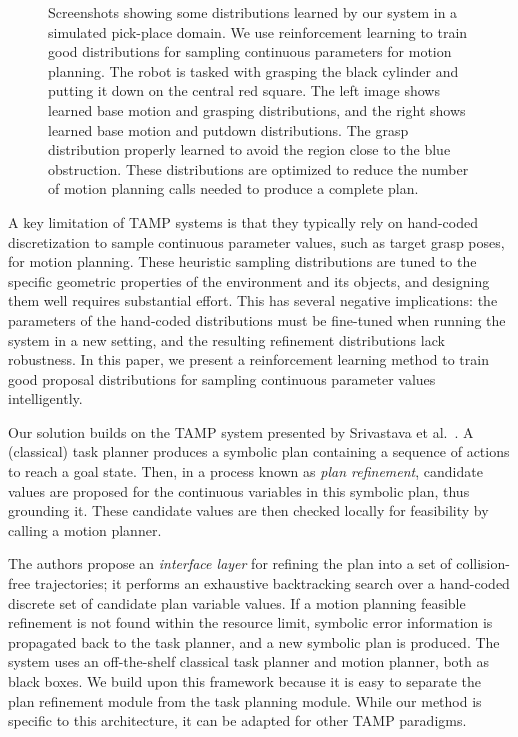 \begin{figure}[h]
  \caption{Screenshots showing some distributions learned by our system in a simulated pick-place
    domain. We use reinforcement learning to train good distributions for sampling continuous parameters
    for motion planning. The robot is tasked with grasping the black cylinder and putting it down on the
    central red square. The left image shows learned base motion and grasping distributions,
    and the right shows learned base motion and putdown distributions. The grasp distribution
    properly learned to avoid the region close to the blue obstruction. These distributions are
    optimized to reduce the number of motion planning calls needed to produce a complete plan.}
  \label{fig:cover}
\end{figure}

A key limitation of TAMP systems is that they typically rely on hand-coded discretization to
sample continuous parameter values, such as target grasp poses, for motion planning.
These heuristic sampling distributions are tuned to the specific
geometric properties of the environment and its objects, and designing them well
requires substantial effort. This has several negative implications: the parameters of the
hand-coded distributions must be fine-tuned when running the system in a new setting, and the
resulting refinement distributions lack robustness. In this paper, we present a reinforcement
learning method to train good proposal distributions for sampling continuous parameter
values intelligently.

Our solution builds on the TAMP system
presented by Srivastava et al.~\cite{srivastava2014combined}.
A (classical) task planner produces a symbolic plan containing
a sequence of actions to reach a goal state. Then, in a process known as \emph{plan refinement},
candidate values are proposed for the continuous variables in this symbolic plan, thus grounding it.
These candidate values are then checked locally for feasibility by calling a motion planner.

The authors propose an \emph{interface layer} for refining the plan into a set
of collision-free trajectories; it performs an exhaustive
backtracking search over a hand-coded discrete set of candidate plan variable values. If a motion
planning feasible refinement is not found within the resource limit,
symbolic error information is propagated back to the task planner, and a new symbolic plan is produced.
The system uses an off-the-shelf classical task planner and motion planner, both as black boxes.
We build upon this framework because it is easy to separate the plan refinement module from the task planning module.
While our method is specific to this architecture, it can be adapted for other TAMP paradigms.

